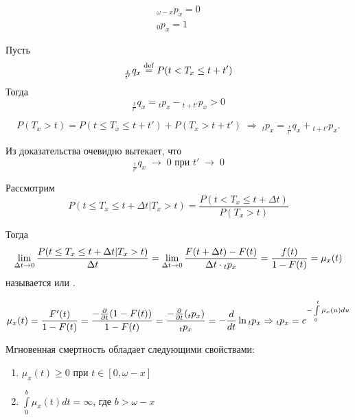 \begin{clair}
	$$\begin{gathered}
		{}_{\omega - x}p_x = 0 \\
		{}_{0}p_x = 1
	\end{gathered}$$
\end{clair}

\begin{clair}
	Пусть 
	$${}_{\frac{t}{t'}}q_x \mathrel{\stackrel{\rm def}=} P(t < T_x \leq t + t')$$
	Тогда 
	$${}_{\frac{t}{t'}}q_x = {}_{t}p_x - {}_{t+t'}p_x > 0$$
\end{clair}
\begin{Proof}
	$$P(T_x > t) = P(t \leq T_x \leq t+t') + P(T_x > t+t') \; \Rightarrow \; {}_{t}p_x = {}_{\frac{t}{t'}}q_x + {}_{t+t'}p_x. $$
\end{Proof}

\begin{conseq}
	Из доказательства очевидно вытекает, что
	$${}_{\frac{t}{t'}}q_x \;\rightarrow \; 0 \text{ при } t'\;\rightarrow\;0$$
\end{conseq}

\begin{definition}
	Рассмотрим $$P(t \leq T_x \leq t + \Delta t| T_x > t) = \frac{P(t < T_x \leq t + \Delta t)}{P(T_x > t)} $$

	Тогда $$\lim\limits_{\Delta t \rightarrow 0}\frac{P(t \leq T_x \leq t + \Delta t| T_x > t)}{\Delta t} = \lim\limits_{\Delta t \rightarrow 0}\frac{F(t + \Delta t) - F(t)}{\Delta t \cdot {}_{t}p_x} = \frac{f(t)}{1 - F(t)} = \mu_x(t)$$ называется  или .
\end{definition}

\begin{remark}
	$$\begin{gathered}
		\mu_x (t) = \frac{F'(t)}{1-F(t)} = \frac{-\frac{\partial}{\partial t}(1-F(t))}{1-F(t)}
		= \frac{-\frac{\partial}{\partial t}({}_{t}p_x)}{{}_{t}p_x} = -\frac{d}{dt}\ln{}_{t}p_x \Rightarrow {}_{t} p_x = e^{-\int\limits_0^t\mu_x(u)du}
	\end{gathered}$$
\end{remark}


\begin{properties}
	Мгновенная смертность обладает следующими свойствами:
	\begin{enumerate}
		\item $\mu_x(t) \geq 0 $ при $t \in [0, \omega - x]$
		\item $\int\limits_0^b\mu_x(t)dt = \infty$, где $b > \omega - x$
	\end{enumerate}
\end{properties}

